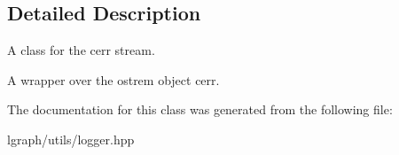 \subsection{Detailed Description}
A class for the cerr stream. 

A wrapper over the ostrem object cerr. 

The documentation for this class was generated from the following file\+:\begin{DoxyCompactItemize}
\item 
lgraph/utils/logger.\+hpp\end{DoxyCompactItemize}
